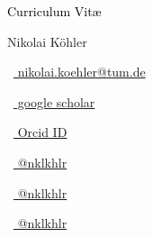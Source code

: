 \begin{scriptsize}
	 \textcolor{black}{Curriculum Vit\ae}
\end{scriptsize}

\vspace*{0.2cm}
\begin{Large}
	Nikolai K\"ohler
\end{Large}

\vspace*{0.20em}
%
\vspace*{0.2cm}

\begin{footnotesize}
	\quad
	\begin{tiny}\faEnvelope[regular]\end{tiny}~\href{mailto:nikolai.koehler@tum.de}{%
		nikolai.koehler@tum.de
	}
	\quad\vspace{.1cm}
	\begin{tiny}\faGraduationCap\end{tiny}~\href{https://scholar.google.com/citations?user=R-szd0IAAAAJ&hl=en&oi=ao}{
		 google scholar
		}
	\begin{tiny}\faOrcid\end{tiny}~\href{https://orcid.org/0000-0002-5103-883X?lang=en}{
		 Orcid ID
		}
	\quad\vspace{.15cm}

	\begin{tiny}\faTwitter\end{tiny}~\href{https://twitter.com/nklkhlr}{
		@nklkhlr
	}
	\quad
	\begin{tiny}\faGithub\end{tiny}~\href{https://github.com/nklkhlr}{
		@nklkhlr
	}
	\begin{tiny}\faGitlab\end{tiny}~\href{https://gitlab.lrz.de/nklkhlr}{
		@nklkhlr
	}

\end{footnotesize}
